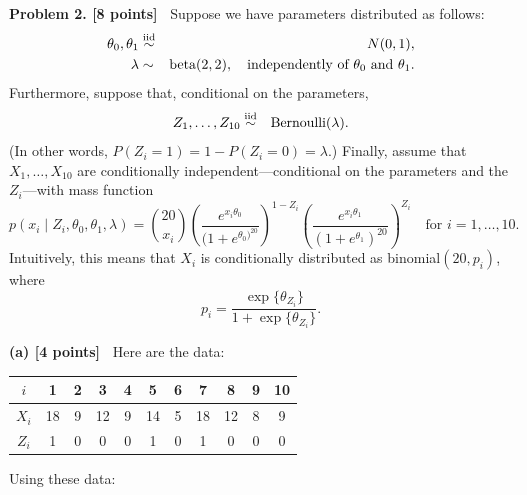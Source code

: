 \documentclass{article}
\newcommand{\svskip}{\vspace{.2in}}
\newcommand{\mvskip}{\vspace{.25in}}
\begin{document}
\mvskip
{\bf Problem 2. [8 points]\ }
Suppose we have parameters distributed as follows:
\begin{eqnarray*}
\theta_0, \theta_1 & \stackrel{\rm iid}{\sim} & N(0,1),\\
\lambda  &\sim& \mbox{beta}(2,2), 
\quad\mbox{independently of $\theta_0$ and $\theta_1$.}\\ 
\end{eqnarray*}
Furthermore, suppose that, conditional on the parameters,
\begin{eqnarray*}
Z_1, \ldots, Z_{10} & \stackrel{\rm iid}{\sim} & \mbox{Bernoulli}(\lambda). \\
\end{eqnarray*}
(In other words, $P(Z_i=1) = 1-P(Z_i=0) = \lambda$.)
Finally, assume that $X_1, \ldots, X_{10}$ are conditionally independent---conditional 
on the parameters and the $Z_i$---with mass function
\[
p(x_i \mid Z_i, \theta_0, \theta_1, \lambda) =
{{20} \choose x_i }
\left( \frac{e^{x_i \theta_0}}{(1 + e^{\theta_0)^{20}}} \right)^{1-Z_i}
\left( \frac{e^{x_i \theta_1}}{(1 + e^{\theta_1})^{20}} \right)^{Z_i}
\quad\mbox{for $i=1, \ldots, 10$.}
\]
Intuitively, this means that
$X_i$ is conditionally distributed as 
binomial$(20, p_i)$, where 
\[
p_i = \frac{\exp\{\theta_{Z_i}\}}{1+\exp\{\theta_{Z_i}\}}.
\]

\svskip
{\bf (a) [4 points]\ }
Here are the data:

\svskip
\begin{tabular}{c|cccccccccc}
$i$ & 1 & 2 & 3 & 4 & 5 & 6 & 7 & 8 & 9 & 10 \\ \hline
$X_i$ & 18 & 9 & 12 & 9 & 14 & 5 & 18 & 12 & 8 & 9 \\ \hline
$Z_i$ & 1 & 0 & 0 & 0 & 1 & 0 & 1 & 0 & 0 & 0 
\end{tabular}

\svskip
Using these data:
\end{document}
